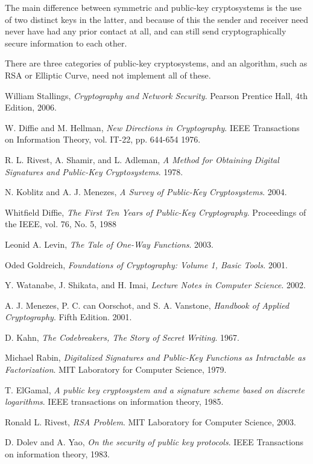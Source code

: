\documentclass[english,titlepage,11pt]{article}
\begin{document}
The main difference between symmetric and public-key cryptosystems is the use of two distinct keys in the latter, and because of this the sender and receiver need never have had any prior contact at all, and can still send cryptographically secure information to each other.

There are three categories of public-key cryptosystems, and an algorithm, such as RSA or Elliptic Curve, need not implement all of these.

\begin{thebibliography}{9}

  William Stallings,
  \emph{Cryptography and Network Security}.
  Pearson Prentice Hall,
  4th Edition,
  2006.
  
  W. Diffie and M. Hellman,
  \emph{New Directions in Cryptography}.
  IEEE Transactions on Information Theory, vol. IT-22, pp. 644-654
  1976.

  R. L. Rivest, A. Shamir, and L. Adleman,
  \emph{A Method for Obtaining Digital Signatures and Public-Key Cryptosystems}.
  1978.

  N. Koblitz and A. J. Menezes,
  \emph{A Survey of Public-Key Cryptosystems}.
  2004.

  Whitfield Diffie,
  \emph{The First Ten Years of Public-Key Cryptography}.
  Proceedings of the IEEE, vol. 76, No. 5,
  1988

  Leonid A. Levin,
  \emph{The Tale of One-Way Functions}.
  2003.

  Oded Goldreich,
  \emph{Foundations of Cryptography: Volume 1, Basic Tools}.
  2001.

  Y. Watanabe, J. Shikata, and H. Imai,
  \emph{Lecture Notes in Computer Science}.
  2002.

  A. J. Menezes, P. C. can Oorschot, and S. A. Vanstone,
  \emph{Handbook of Applied Cryptography}.
  Fifth Edition.
  2001.

  D. Kahn, 
  \emph{The Codebreakers, The Story of Secret Writing}.
  1967.

  Michael Rabin,
  \emph{Digitalized Signatures and Public-Key Functions as Intractable as Factorization}. 
  MIT Laboratory for Computer Science,
	1979.

  T. ElGamal,
  \emph{A public key cryptosystem and a signature scheme based on discrete logarithms}.
	IEEE transactions on information theory, 
	1985.

  Ronald L. Rivest,
	\emph{RSA Problem}.
	MIT Laboratory for Computer Science,
	2003.

	D. Dolev and A. Yao,
	\emph{On the security of public key protocols}.
	IEEE Transactions on information theory, 
	1983.

\end{thebibliography}
\end{document}
